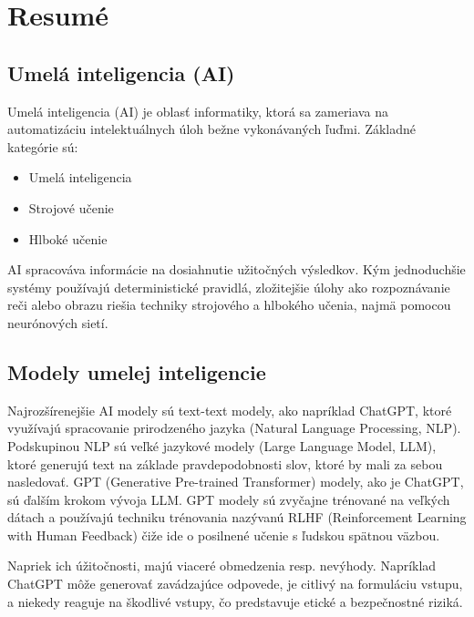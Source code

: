 \chapter{Resumé}


\section*{Umelá inteligencia (AI) \label{sec:AI_resume}}

Umelá inteligencia (AI) je oblasť informatiky, ktorá sa zameriava na automatizáciu intelektuálnych úloh bežne vykonávaných ľuďmi. Základné kategórie sú:

\begin{itemize}
    \item Umelá inteligencia
    \item Strojové učenie
    \item Hlboké učenie
\end{itemize}

AI spracováva informácie na dosiahnutie užitočných výsledkov. Kým jednoduchšie systémy používajú deterministické pravidlá, zložitejšie úlohy ako rozpoznávanie reči alebo obrazu riešia techniky strojového a hlbokého učenia, najmä pomocou neurónových sietí.

\section*{Modely umelej inteligencie \label{sec:AI_models_resume}}

Najrozšírenejšie AI modely sú text-text modely, ako napríklad ChatGPT, ktoré využívajú spracovanie prirodzeného jazyka (Natural Language Processing, NLP). Podskupinou NLP sú veľké jazykové modely (Large Language Model, LLM), ktoré generujú text na základe pravdepodobnosti slov, ktoré by mali za sebou nasledovať. GPT (Generative Pre-trained Transformer) modely, ako je ChatGPT, sú ďalším krokom vývoja LLM. GPT modely sú zvyčajne trénované na veľkých dátach a používajú techniku trénovania  nazývanú RLHF (Reinforcement Learning with Human Feedback) čiže ide o posilnené učenie s ľudskou spätnou väzbou.

Napriek ich úžitočnosti, majú viaceré obmedzenia resp. nevýhody. Napríklad ChatGPT môže generovať zavádzajúce odpovede, je citlivý na formuláciu vstupu, a niekedy reaguje na škodlivé vstupy, čo predstavuje etické a bezpečnostné riziká.

